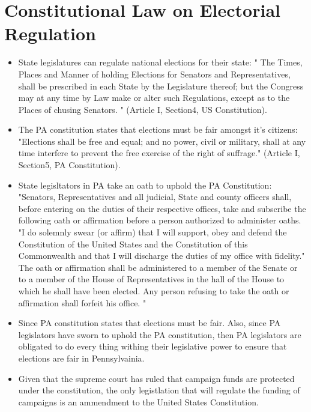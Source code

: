 \documentclass[11pt]{article} %
\begin{document}
\begin{itemize}
\begin{comment}
\end{comment}
\end{itemize}
 

\section{Constitutional Law on Electorial Regulation}


\begin{itemize}

\item State legislatures can regulate national elections for their state: " The Times, Places and Manner of holding Elections for Senators and Representatives, shall be prescribed in each State by the Legislature thereof; but the Congress may at any time by Law make or alter such Regulations, except as to the Places of chusing Senators. " (Article I, Section4, US Constitution).

\item The PA constitution states that elections must be fair amongst it's citizens: "Elections shall be free and equal; and no power, civil or military, shall at any time interfere to prevent the free exercise of the right of suffrage." (Article I, Section5, PA Constitution).

\item  State legisltators in PA take an oath to uphold the PA Constitution: "Senators, Representatives and all judicial, State and county officers shall, before entering on the duties of their respective offices, take and subscribe the following oath or affirmation before a person authorized to administer oaths. "I do solemnly swear (or affirm) that I will support, obey and defend the Constitution of the United States and the Constitution of this Commonwealth and that I will discharge the duties of my office with fidelity." The oath or affirmation shall be administered to a member of the Senate or to a member of the House of Representatives in the hall of the House to which he shall have been elected. Any person refusing to take the oath or affirmation shall forfeit his office. "

\item Since PA constitution states that elections must be fair.  Also, since PA legislators have sworn to uphold the PA constitution, then PA legislators are obligated to do every thing withing their legislative power to ensure that elections are fair in Pennsylvainia. 

\item Given that the supreme court has ruled that campaign funds are protected under the constitution, the only legistlation that will regulate the funding of campaigns is an ammendment to the United States Constitution. 

\end{itemize}
\end{document}
